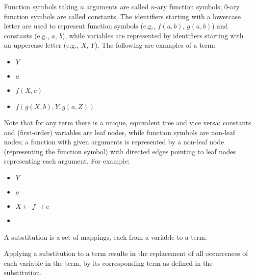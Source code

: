 Function symbols taking $n$ arguments are called $n$-ary function symbols; 0-ary function symbols are called constants. The identifiers starting with a lowercase letter are used to represent function symbols (e.g., $f(a,b)$, $g(a,b)$) and constants (e.g., $a$, $b$), while variables are represented by identifiers starting with an uppercase letter (e.g., $X$, $Y$). The following are examples of a term:
\begin{itemize} [leftmargin=0.7in]
\item $Y$
\item $a$
\item $f(X, c)$
\item $f(g(X, b),Y, g(a, Z))$
\end{itemize}
Note that for any term there is a unique, equivalent tree and vice versa: constants and (first-order) variables are leaf nodes, while function symbols are non-leaf nodes; a function with given arguments is represented by a non-leaf node (representing the function symbol) with directed edges pointing to leaf nodes representing each argument.  For example:
\begin{itemize} [leftmargin=0.7in]
\item $Y$
\item $a$
\item $X \leftarrow f \rightarrow c$
\item {}
\end{itemize}

\begin{defn}[Substitution]\label{def:substitution}
A substitution is a set of mappings, each from a variable to a term.
\end{defn}

\begin{defn}\label{def:substitution}
Applying a substitution to a term results in the replacement of all occurrences of each variable in the term, by its corresponding term as defined in the substitution.
\end{defn}

